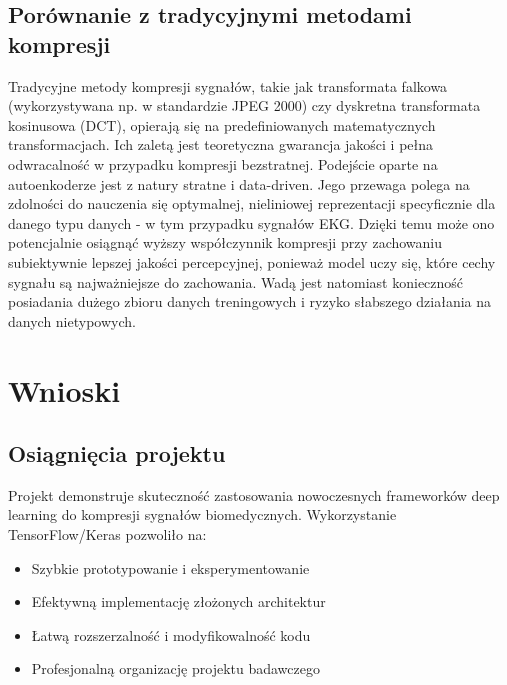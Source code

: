 \documentclass[12pt,a4paper]{article}
\begin{document}
\subsection{Porównanie z tradycyjnymi metodami kompresji}

Tradycyjne metody kompresji sygnałów, takie jak transformata falkowa (wykorzystywana np. w standardzie JPEG 2000) czy dyskretna transformata kosinusowa (DCT), opierają się na predefiniowanych matematycznych transformacjach. Ich zaletą jest teoretyczna gwarancja jakości i pełna odwracalność w przypadku kompresji bezstratnej. Podejście oparte na autoenkoderze jest z natury stratne i data-driven. Jego przewaga polega na zdolności do nauczenia się optymalnej, nieliniowej reprezentacji specyficznie dla danego typu danych - w tym przypadku sygnałów EKG. Dzięki temu może ono potencjalnie osiągnąć wyższy współczynnik kompresji przy zachowaniu subiektywnie lepszej jakości percepcyjnej, ponieważ model uczy się, które cechy sygnału są najważniejsze do zachowania. Wadą jest natomiast konieczność posiadania dużego zbioru danych treningowych i ryzyko słabszego działania na danych nietypowych.

\section{Wnioski}

\subsection{Osiągnięcia projektu}

Projekt demonstruje skuteczność zastosowania nowoczesnych frameworków deep learning do kompresji sygnałów biomedycznych. Wykorzystanie TensorFlow/Keras pozwoliło na:

\begin{itemize}
    \item Szybkie prototypowanie i eksperymentowanie
    \item Efektywną implementację złożonych architektur
    \item Łatwą rozszerzalność i modyfikowalność kodu
    \item Profesjonalną organizację projektu badawczego
\end{itemize}
\end{document}
